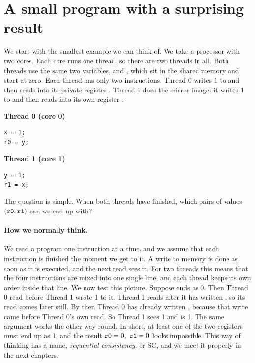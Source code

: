 \section{A small program with a surprising result}
\label{sec:intro-sb}

We start with the smallest example we can think of. We take a processor with two cores. Each core runs one thread, so there are two threads in all. Both threads use the same two variables,  and , which sit in the shared memory and start at zero. Each thread has only two instructions. Thread 0 writes 1 to  and then reads  into its private register . Thread 1 does the mirror image: it writes 1 to  and then reads  into its own register .

\begin{center}
\begin{minipage}{0.38\textwidth}
\centering\textbf{Thread 0 (core 0)}
\begin{lstlisting}[style=vsc,numbers=none]
x = 1;
r0 = y;
\end{lstlisting}
\end{minipage}\hspace{1cm}
\begin{minipage}{0.38\textwidth}
\centering\textbf{Thread 1 (core 1)}
\begin{lstlisting}[style=vsc,numbers=none]
y = 1;
r1 = x;
\end{lstlisting}
\end{minipage}
\end{center}

The question is simple. When both threads have finished, which pairs of values $(\texttt{r0}, \texttt{r1})$ can we end up with?

\paragraph{How we normally think.} We read a program one instruction at a time, and we assume that each instruction is finished the moment we get to it. A write to memory is done as soon as it is executed, and the next read sees it. For two threads this means that the four instructions are mixed into one single line, and each thread keeps its own order inside that line. We now test this picture. Suppose  ends as 0. Then Thread 0 read  before Thread 1 wrote 1 to it. Thread 1 reads  after it has written , so its read comes later still. By then Thread 0 has already written , because that write came before Thread 0's own read. So Thread 1 sees 1 and  is 1. The same argument works the other way round. In short, at least one of the two registers must end up as 1, and the result $\texttt{r0} = 0,\ \texttt{r1} = 0$ looks impossible. This way of thinking has a name, \emph{sequential consistency}, or SC, and we meet it properly in the next chapters.

